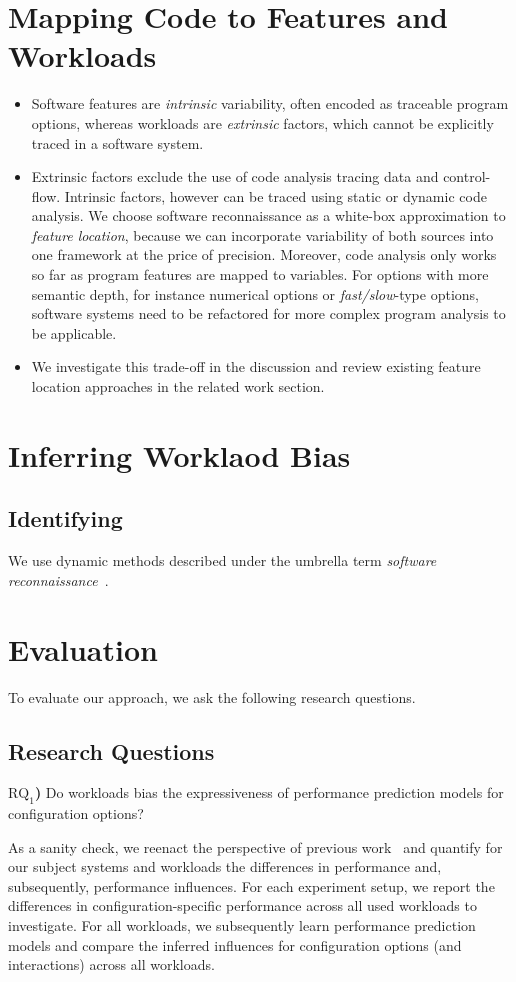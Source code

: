 \documentclass[conference]{IEEEtran}
\newcommand{\greybox}[1]{
	\begin{mdframed}[
		backgroundcolor=MidnightBlue!10,
		linewidth=0pt,
		innerleftmargin=5pt,
		innertopmargin=5pt,
		roundcorner=3pt,
		]
		#1
	\end{mdframed}
}
\begin{document}
\section{Mapping Code to Features and Workloads}\label{sec:mapping}

\begin{itemize}
	\item Software features are \emph{intrinsic} variability, often encoded as traceable program options, whereas workloads are \emph{extrinsic} factors, which cannot be explicitly traced in a software system.
	\item Extrinsic factors exclude the use of code analysis tracing data and control-flow. Intrinsic factors, however can be traced using static or dynamic code analysis. 
	We choose software reconnaissance as a white-box approximation to \emph{feature location}, because we can incorporate variability of both sources into one framework at the price of precision. Moreover, code analysis only works so far as program features are mapped to variables. For options with more semantic depth, for instance numerical options or \emph{fast/slow}-type options, software systems need to be refactored for more complex program analysis to be applicable.
	\item We investigate this trade-off in the discussion and review existing feature location approaches in the related work section.
\end{itemize}


\section{Inferring Worklaod Bias}
\subsection{Identifying }
We use dynamic methods described under the umbrella term \emph{software reconnaissance}~\cite{wilde_reconnaissance_1995}.

\section{Evaluation}
To evaluate our approach, we ask the following research questions.

\subsection{Research Questions}
\greybox{\textbf{$\text{RQ}_1$)} Do workloads bias the expressiveness of performance prediction models for configuration options?}
As a sanity check, we reenact the perspective of previous work~\cite{alves_sampling_2020,jamishidi_transfer_2017,jamshidi_learning_2018,jamshidi_transfer_gp_2017} and quantify for our subject systems and workloads the differences in performance and, subsequently, performance influences. For each experiment setup, we report the differences in configuration-specific performance across all used workloads to investigate. For all workloads, we subsequently learn performance prediction models and compare the inferred influences for configuration options (and interactions) across all workloads.
\end{document}
